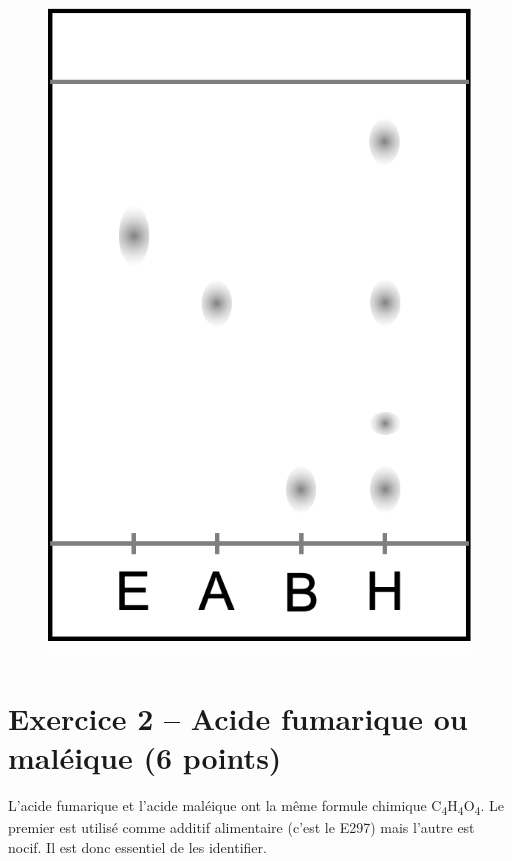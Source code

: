 \begin{enumerate}
\begin{figure}[h]
\center
\includegraphics[scale=0.4]{../images/ccm_menthe.png}
\end{figure}
\end{enumerate}

\section*{Exercice 2 -- Acide fumarique ou maléique (6 points)}

L'acide fumarique et l'acide maléique ont la même formule chimique C\textsubscript{4}H\textsubscript{4}O\textsubscript{4}.
Le premier est utilisé comme additif alimentaire (c'est le E297) mais l'autre est nocif.
Il est donc essentiel de les identifier.

